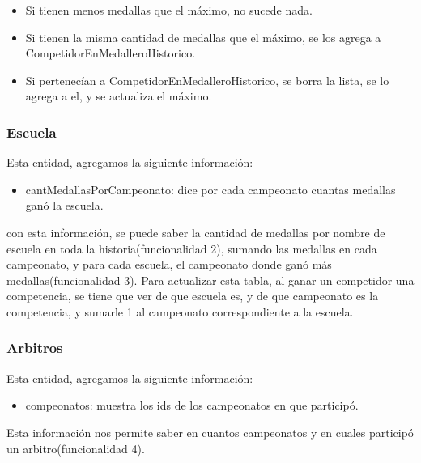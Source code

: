 \begin{itemize}
	\item Si tienen menos medallas que el máximo, no sucede nada.
	\item Si tienen la misma cantidad de medallas que el máximo, se los agrega a CompetidorEnMedalleroHistorico.
	\item Si pertenecían a CompetidorEnMedalleroHistorico, se borra la lista, se lo agrega a el, y se actualiza el máximo.
\end{itemize}


\subsubsection{Escuela}

Esta entidad, agregamos la siguiente información:

\begin{itemize}
	\item cantMedallasPorCampeonato: dice por cada campeonato cuantas medallas ganó la escuela.
\end{itemize}
 
 con esta información, se puede saber la cantidad de medallas por nombre de escuela en toda la historia(funcionalidad 2), sumando las medallas en cada campeonato, y para cada escuela, el campeonato donde ganó más medallas(funcionalidad 3). Para actualizar esta tabla, al ganar un competidor una competencia, se tiene que ver de que escuela es, y de que campeonato es la competencia, y sumarle 1 al campeonato correspondiente a la escuela.
 
\subsubsection{Arbitros}

Esta entidad, agregamos la siguiente información:

\begin{itemize}
	\item compeonatos: muestra los ids de los campeonatos en que participó.
\end{itemize}

Esta información nos permite saber en cuantos campeonatos y en cuales participó un arbitro(funcionalidad 4).